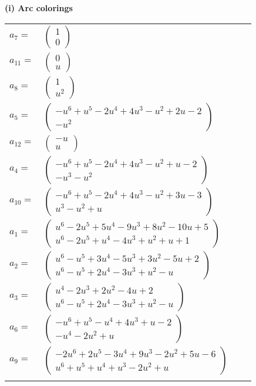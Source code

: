 \documentclass[1p]{elsarticle_modified}
\theoremstyle{definition}
\begin{document}
\flushleft \textbf{(i) Arc colorings}\\
\begin{tabular}{m{7pt} m{180pt} m{7pt} m{180pt} }
\flushright $a_{7}=$&$\begin{pmatrix}1\\0\end{pmatrix}$ \\
\flushright $a_{11}=$&$\begin{pmatrix}0\\u\end{pmatrix}$ \\
\flushright $a_{8}=$&$\begin{pmatrix}1\\u^2\end{pmatrix}$ \\
\flushright $a_{5}=$&$\begin{pmatrix}- u^6+u^5-2 u^4+4 u^3- u^2+2 u-2\\- u^2\end{pmatrix}$ \\
\flushright $a_{12}=$&$\begin{pmatrix}- u\\u\end{pmatrix}$ \\
\flushright $a_{4}=$&$\begin{pmatrix}- u^6+u^5-2 u^4+4 u^3- u^2+u-2\\- u^3- u^2\end{pmatrix}$ \\
\flushright $a_{10}=$&$\begin{pmatrix}- u^6+u^5-2 u^4+4 u^3- u^2+3 u-3\\u^3- u^2+u\end{pmatrix}$ \\
\flushright $a_{1}=$&$\begin{pmatrix}u^6-2 u^5+5 u^4-9 u^3+8 u^2-10 u+5\\u^6-2 u^5+u^4-4 u^3+u^2+u+1\end{pmatrix}$ \\
\flushright $a_{2}=$&$\begin{pmatrix}u^6- u^5+3 u^4-5 u^3+3 u^2-5 u+2\\u^6- u^5+2 u^4-3 u^3+u^2- u\end{pmatrix}$ \\
\flushright $a_{3}=$&$\begin{pmatrix}u^4-2 u^3+2 u^2-4 u+2\\u^6- u^5+2 u^4-3 u^3+u^2- u\end{pmatrix}$ \\
\flushright $a_{6}=$&$\begin{pmatrix}- u^6+u^5- u^4+4 u^3+u-2\\- u^4-2 u^2+u\end{pmatrix}$ \\
\flushright $a_{9}=$&$\begin{pmatrix}-2 u^6+2 u^5-3 u^4+9 u^3-2 u^2+5 u-6\\u^6+u^5+u^4+u^3-2 u^2+u\end{pmatrix}$\\&\end{tabular}
\end{document}
